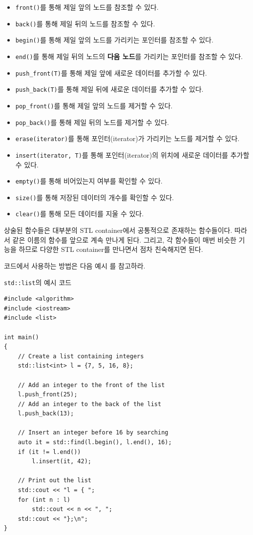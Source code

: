 \begin{itemize}
    \item \texttt{front()}를 통해 제일 앞의 노드를 참조할 수 있다.
    \item \texttt{back()}를 통해 제일 뒤의 노드를 참조할 수 있다.
    \item \texttt{begin()}를 통해 제일 앞의 노드를 가리키는 포인터를 참조할 수 있다.
    \item \texttt{end()}를 통해 제일 뒤의 노드의 \textbf{다음 노드}를 가리키는 포인터를 참조할 수 있다.
    \item \texttt{push\_front(T)}를 통해 제일 앞에 새로운 데이터를 추가할 수 있다.
    \item \texttt{push\_back(T)}를 통해 제일 뒤에 새로운 데이터를 추가할 수 있다.
    \item \texttt{pop\_front()}를 통해 제일 앞의 노드를 제거할 수 있다.
    \item \texttt{pop\_back()}를 통해 제일 뒤의 노드를 제거할 수 있다.
    \item \texttt{erase(iterator)}를 통해 포인터(iterator)가 가리키는 노드를 제거할 수 있다.
    \item \texttt{insert(iterator, T)}를 통해 포인터(iterator)의 위치에 새로운 데이터를 추가할 수 있다.
    \item \texttt{empty()}를 통해 비어있는지 여부를 확인할 수 있다.
    \item \texttt{size()}를 통해 저장된 데이터의 개수를 확인할 수 있다.
    \item \texttt{clear()}를 통해 모든 데이터를 지울 수 있다.
\end{itemize}

상술된 함수들은 대부분의 STL container에서 공통적으로 존재하는 함수들이다. 따라서 같은 이름의 함수를 앞으로 계속 만나게 된다. 그리고, 각 함수들이 매번 비슷한 기능을 하므로 다양한 STL container를 만나면서 점차 친숙해지면 된다.

코드에서 사용하는 방법은 다음 예시 를 참고하라.

\begin{code} \label{code: std-list-ex}
\texttt{std::list}의 예시 코드
\begin{lstlisting}
#include <algorithm>
#include <iostream>
#include <list>
    
int main()
{
    // Create a list containing integers
    std::list<int> l = {7, 5, 16, 8};
    
    // Add an integer to the front of the list
    l.push_front(25);
    // Add an integer to the back of the list
    l.push_back(13);
    
    // Insert an integer before 16 by searching
    auto it = std::find(l.begin(), l.end(), 16);
    if (it != l.end())
        l.insert(it, 42);
    
    // Print out the list
    std::cout << "l = { ";
    for (int n : l)
        std::cout << n << ", ";
    std::cout << "};\n";
}
\end{lstlisting}
\end{code}

